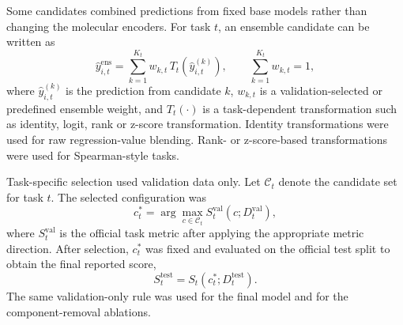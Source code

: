 \documentclass[10pt]{article}
\begin{document}
Some candidates combined predictions from fixed base models rather than changing the molecular encoders. For task $t$, an ensemble candidate can be written as
\begin{equation}
  \hat{y}_{i,t}^{\mathrm{ens}}
  =
  \sum_{k=1}^{K_t} w_{k,t}\,T_t\!\left(\hat{y}_{i,t}^{(k)}\right),
  \qquad
  \sum_{k=1}^{K_t} w_{k,t}=1,
\end{equation}
where $\hat{y}_{i,t}^{(k)}$ is the prediction from candidate $k$, $w_{k,t}$ is a validation-selected or predefined ensemble weight, and $T_t(\cdot)$ is a task-dependent transformation such as identity, logit, rank or z-score transformation. Identity transformations were used for raw regression-value blending. Rank- or z-score-based transformations were used for Spearman-style tasks.

Task-specific selection used validation data only. Let $\mathcal{C}_t$ denote the candidate set for task $t$. The selected configuration was
\begin{equation}
  c_t^{\ast}
  =
  \arg\max_{c \in \mathcal{C}_t}
  S_t^{\mathrm{val}}\!\left(c;D_t^{\mathrm{val}}\right),
\end{equation}
where $S_t^{\mathrm{val}}$ is the official task metric after applying the appropriate metric direction. After selection, $c_t^{\ast}$ was fixed and evaluated on the official test split to obtain the final reported score,
\begin{equation}
  S_t^{\mathrm{test}}
  =
  S_t\!\left(c_t^{\ast};D_t^{\mathrm{test}}\right).
\end{equation}
The same validation-only rule was used for the final model and for the component-removal ablations.
\end{document}
